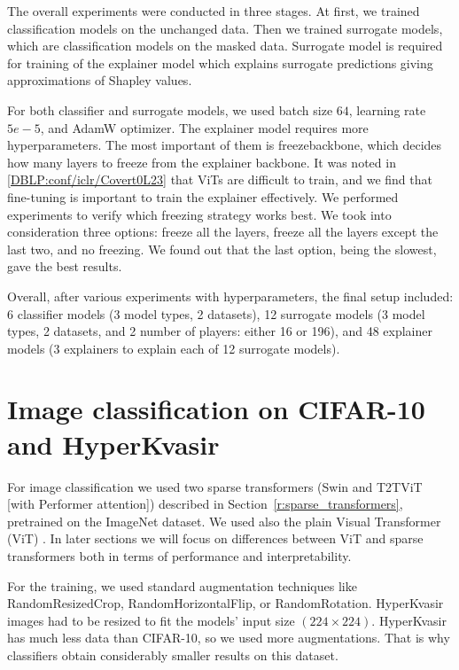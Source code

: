 \documentclass[magisterska,en]{pracamgr}
\begin{document}
The overall experiments were conducted in three stages. At first, we trained classification models on the unchanged data. Then we trained surrogate models, which are classification models on the masked data. Surrogate model is required for training of the explainer model which explains surrogate predictions giving approximations of Shapley values.

For both classifier and surrogate models, we used batch size $64$, learning rate $5e-5$, and AdamW optimizer. The explainer model requires more hyperparameters. The most important of them is freeze\textunderscore backbone, which decides how many layers to freeze from the explainer backbone. It was noted in \ref{DBLP:conf/iclr/Covert0L23} that ViTs are difficult to train, and we find that fine-tuning is important to train the explainer effectively. We performed experiments to verify which freezing strategy works best. We took into consideration three options: freeze all the layers, freeze all the layers except the last two, and no freezing. We found out that the last option, being the slowest, gave the best results.

Overall, after various experiments with hyperparameters, the final setup included: 6 classifier models (3 model types, 2 datasets), 12 surrogate models (3 model types, 2 datasets, and 2 number of players: either 16 or 196), and 48 explainer models (3 explainers to explain each of 12 surrogate models).


\section{Image classification on CIFAR-10 and HyperKvasir}

For image classification we used two sparse transformers (Swin and T2T\textunderscore ViT [with Performer attention]) described in Section~\ref{r:sparse_transformers}, pretrained on the ImageNet dataset. 
We used also the plain Visual Transformer (ViT) \cite{DBLP:conf/iclr/DosovitskiyB0WZ21}. In later sections we will focus on differences between ViT and sparse transformers both in terms of performance and interpretability. 

For the training, we used standard augmentation techniques like RandomResizedCrop, RandomHorizontalFlip, or RandomRotation. HyperKvasir images had to be resized to fit the models' input size $(224\times 224)$. HyperKvasir has much less data than CIFAR-10, so we used more augmentations. That is why classifiers obtain considerably smaller results on this dataset.
\end{document}
